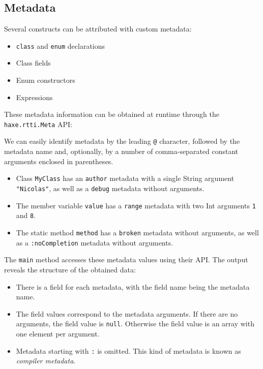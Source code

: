 \documentclass{article}
\newcommand{\type}[1]{\texttt{#1}}
\newcommand{\expr}[1]{\texttt{#1}}
\begin{document}
\subsection{Metadata}
\label{Metadata}

Several constructs can be attributed with custom metadata:

\begin{itemize}
	\item \expr{class} and \expr{enum} declarations
	\item Class fields
	\item Enum constructors
	\item Expressions
\end{itemize}

These metadata information can be obtained at runtime through the \type{haxe.rtti.Meta} API:



We can easily identify metadata by the leading \expr{@} character, followed by the metadata name and, optionally, by a number of comma-separated constant arguments enclosed in parentheses.

\begin{itemize}
	\item Class \type{MyClass} has an \expr{author} metadata with a single String argument \expr{"Nicolas"}, as well as a \expr{debug} metadata without arguments.
	\item The member variable \expr{value} has a \expr{range} metadata with two Int arguments \expr{1} and \expr{8}.
	\item The static method \expr{method} has a \expr{broken} metadata without arguments, as well as a \expr{:noCompletion} metadata without arguments.
\end{itemize}

The \expr{main} method accesses these metadata values using their API. The output reveals the structure of the obtained data:

\begin{itemize}
	\item There is a field for each metadata, with the field name being the metadata name.
	\item The field values correspond to the metadata arguments. If there are no arguments, the field value is \expr{null}. Otherwise the field value is an array with one element per argument.
	\item Metadata starting with \expr{:} is omitted. This kind of metadata is known as \emph{compiler metadata}.
\end{itemize}
\end{document}
